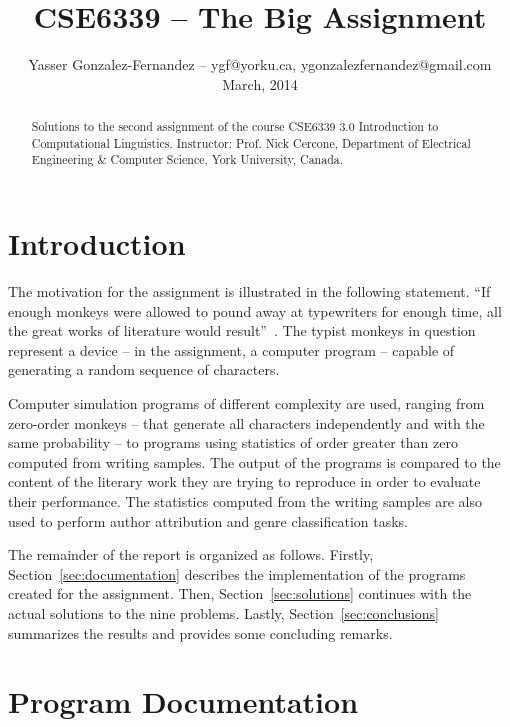 \documentclass[conference]{IEEEtran}
\begin{document}
\title{CSE6339 -- The Big Assignment\vspace{-14pt}}
\author{Yasser Gonzalez-Fernandez -- ygf@yorku.ca, ygonzalezfernandez@gmail.com\vspace{4pt} \\ March, 2014}

\maketitle


\begin{abstract}
Solutions to the second assignment of the course CSE6339 3.0 Introduction to Computational Linguistics. 
Instructor: Prof. Nick Cercone, Department of Electrical Engineering \& Computer Science, York University, Canada.
\end{abstract}

\section{Introduction}

The motivation for the assignment is illustrated in the following statement.
``If enough monkeys were allowed to pound away at typewriters for enough time, all the great works of literature would result''~\cite{Bennett1976}.
The typist monkeys in question represent a device -- in the assignment, a computer program -- capable of generating a random sequence of characters.

Computer simulation programs of different complexity are used, ranging from zero-order monkeys -- that generate all characters independently and with the same probability -- to programs using statistics of order greater than zero computed from writing samples.
The output of the programs is compared to the content of the literary work they are trying to reproduce in order to evaluate their performance.
The statistics computed from the writing samples are also used to perform author attribution and genre classification tasks.

The remainder of the report is organized as follows.
Firstly, Section~\ref{sec:documentation} describes the implementation of the programs created for the assignment.
Then, Section~\ref{sec:solutions} continues with the actual solutions to the nine problems.
Lastly, Section~\ref{sec:conclusions} summarizes the results and provides some concluding remarks.


\section{Program Documentation\label{sec:documentation}}
\end{document}
